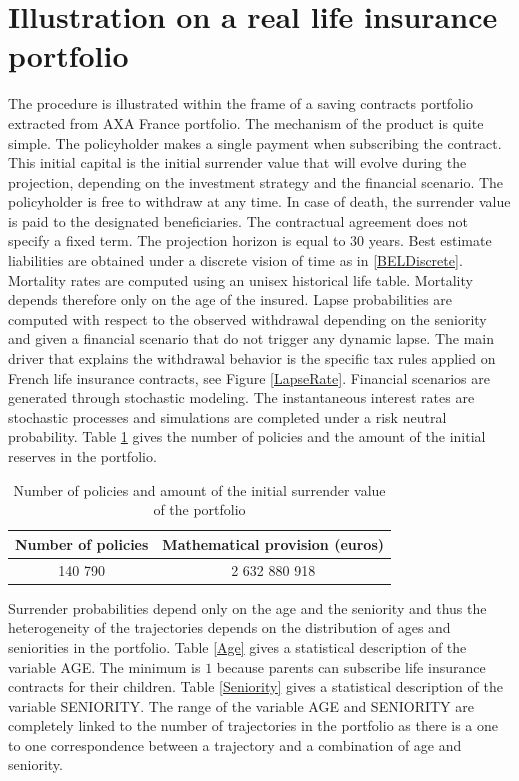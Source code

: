 \section{Illustration on a real life insurance portfolio}
The procedure is illustrated within the frame of a saving contracts portfolio extracted from AXA France portfolio. The mechanism of the product is quite simple. The policyholder makes a single payment when subscribing the contract. This initial capital is the initial surrender value that will evolve during the projection, depending on the investment strategy and the financial scenario. The policyholder is free to withdraw at any time. In case of death, the surrender value is paid to the designated beneficiaries. The contractual agreement does not specify a fixed term. The projection horizon is equal to 30 years. Best estimate liabilities are obtained under a discrete vision of time as in \eqref{BELDiscrete}. Mortality rates are computed using an unisex historical life table. Mortality depends therefore only on the age of the insured. Lapse probabilities are computed with respect to the observed withdrawal depending on the seniority and given a financial scenario that do not trigger any dynamic lapse. The main driver that explains the withdrawal behavior is the specific tax rules applied on French life insurance contracts, see Figure \ref{LapseRate}. Financial scenarios are generated through stochastic modeling. The instantaneous interest rates are stochastic processes and simulations are completed under a risk neutral probability. Table \ref{NbPolicies} gives the number of policies and the amount of the initial reserves in the portfolio.
\begin{table}[ht!]
\centering
\begin{tabular}{|c|c|}
\hline
 Number of policies&Mathematical provision (euros) \\
\hline\hline
140 790&2 632 880 918\\
\hline
\end{tabular}
\caption{Number of policies and amount of the initial surrender value of the portfolio}
\label{NbPolicies}
\end{table}
Surrender probabilities depend only on the age and the seniority and thus the heterogeneity of the trajectories depends on the distribution of ages and seniorities in the portfolio. Table \ref{Age} gives a statistical description of the variable AGE. The minimum is $1$ because parents can subscribe life insurance contracts for their children. Table \ref{Seniority} gives a statistical description of the variable SENIORITY. The range of the variable AGE and SENIORITY are completely linked to the number of trajectories in the portfolio as there is a one to one correspondence between a trajectory and a combination of age and seniority.
